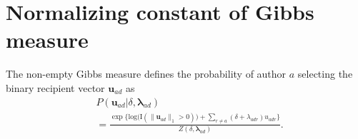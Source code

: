 \documentclass{article}
\begin{document}
\printAffiliationsAndNotice{\icmlEqualContribution} %

\section{Normalizing constant of Gibbs measure}\label{sec: non-empty Gibbs measure}
 	 The non-empty Gibbs measure defines the probability of author $a$ selecting the binary recipient vector $\boldsymbol{u}_{ad}$ as
 	 \begin{equation*} 
 	 	\begin{aligned}
 	 		& P(\boldsymbol{u}_{ad}| \delta, \boldsymbol{\lambda}_{ad} ) \\&= \frac{\exp\Big\{ \mbox{log}\big(\text{I}(\lVert \boldsymbol{u}_{ad} \rVert_1 > 0)\big) + \sum_{r \neq a} (\delta+\lambda_{adr})u_{adr} \Big\}}{Z(\delta,\boldsymbol{\lambda}_{ad})}.
 	 	\end{aligned}
 	 \end{equation*}
 	 
\end{document}
